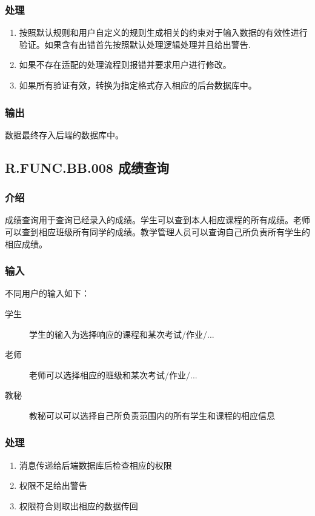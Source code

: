     \subsubsection{处理}
    \begin{enumerate}
      \item 按照默认规则和用户自定义的规则生成相关的约束对于输入数据的有效性进行验证。如果含有出错首先按照默认处理逻辑处理并且给出警告.
      \item 如果不存在适配的处理流程则报错并要求用户进行修改。
      \item 如果所有验证有效，转换为指定格式存入相应的后台数据库中。
    \end{enumerate}
    \subsubsection{输出}
    数据最终存入后端的数据库中。

  \subsection{R.FUNC.BB.008 成绩查询}
    \subsubsection{介绍}
    成绩查询用于查询已经录入的成绩。学生可以查到本人相应课程的所有成绩。老师可以查到相应班级所有同学的成绩。教学管理人员可以查询自己所负责所有学生的相应成绩。
    \subsubsection{输入}
    不同用户的输入如下：
    \begin{center}\begin{description}
      \item[学生] 学生的输入为选择响应的课程和某次考试/作业/...
      \item[老师] 老师可以选择相应的班级和某次考试/作业/...
      \item[教秘] 教秘可以可以选择自己所负责范围内的所有学生和课程的相应信息
    \end{description}\end{center}
    \subsubsection{处理}
    \begin{enumerate}
      \item 消息传递给后端数据库后检查相应的权限
      \item 权限不足给出警告
      \item 权限符合则取出相应的数据传回
    \end{enumerate}
